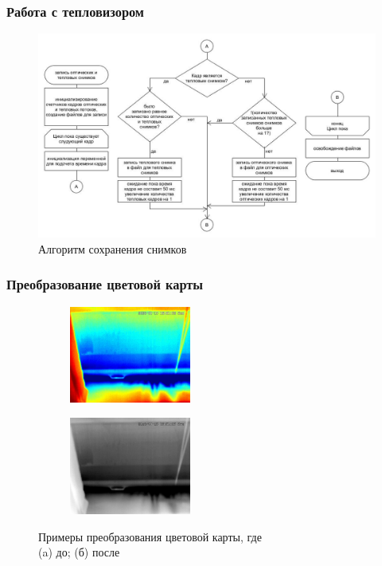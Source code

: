 \documentclass[t]{beamer}
\begin{document}
	\begin{frame}
		\frametitle{Работа с тепловизором}
		\vspace*{-0.45cm}
		\begin{figure}[h!]
			\centering
			\includegraphics[width = \textwidth]{image/chapter_2/loaddata}	
			\caption{Алгоритм сохранения снимков}
			\label{fig:loaddata}
		\end{figure}
	\end{frame}

	\begin{frame}
		\frametitle{Преобразование цветовой карты}
		\vspace*{0.45cm}
		\begin{figure}[ht!]
			\begin{subfigure}{.45\textwidth}
				\centering
				\includegraphics[width = 4cm]{image/chapter_2/tep_example}
				\caption{}
			\end{subfigure}
			\begin{subfigure}{.45\textwidth}
				\centering
				\includegraphics[width = 4cm]{image/chapter_2/gray_tep_example}
				\caption{}
			\end{subfigure}
			\centering
			\caption{Примеры преобразования цветовой карты, где\\ (a) до; (б) после}
			\label{fig:ResKNN}
		\end{figure}
	\end{frame}
\end{document}
